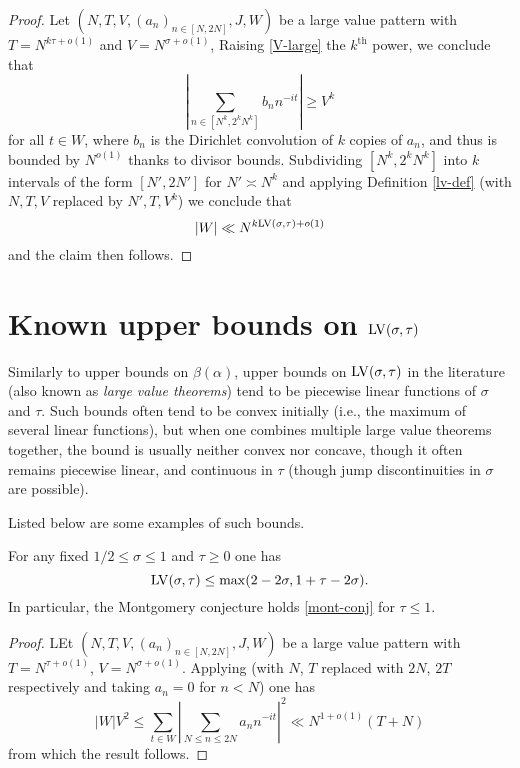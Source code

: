 \begin{proof} Let  $(N,T,V,(a_n)_{n \in [N,2N]},J,W)$ be a large value pattern with $T = N^{k\tau+o(1)}$ and $V = N^{\sigma+o(1)}$, Raising \eqref{V-large} the $k^{\mathrm{th}}$ power, we conclude that
$$ \left|\sum_{n \in [N^k,2^kN^k]} b_n n^{-it} \right| \geq V^k$$
for all $t \in W$, where $b_n$ is the Dirichlet convolution of $k$ copies of $a_n$, and thus is bounded by $N^{o(1)}$ thanks to divisor bounds.  Subdividing $[N^k, 2^k N^k]$ into $k$ intervals of the form $[N',2N']$ for $N' \asymp N^k$ and applying Definition \ref{lv-def} (with $N, T, V$ replaced by $N', T, V^k$) we conclude that
$$ |W| \ll N^{k \mathrm{LV}(\sigma,\tau) + o(1)}$$
and the claim then follows.
\end{proof}

\section{Known upper bounds on \texorpdfstring{$\mathrm{LV}(\sigma,\tau)$}{LV(sigma,tau)}}

Similarly to upper bounds on $\beta(\alpha)$, upper bounds on $\mathrm{LV}(\sigma,\tau)$ in the literature (also known as \emph{large value theorems}) tend to be piecewise linear functions of $\sigma$ and $\tau$.  Such bounds often tend to be convex initially (i.e., the maximum of several linear functions), but when one combines multiple large value theorems together, the bound is usually neither convex nor concave, though it often remains piecewise linear, and continuous in $\tau$ (though jump discontinuities in $\sigma$ are possible).

Listed below are some examples of such bounds.

\begin{theorem}\label{l2-mvt} For any fixed $1/2 \leq \sigma \leq 1$ and $\tau\geq 0$ one has
    $$ \mathrm{LV}(\sigma,\tau) \leq \max( 2-2\sigma, 1 + \tau - 2 \sigma).$$
In particular, the Montgomery conjecture holds \eqref{mont-conj} for $\tau \leq 1$.
\end{theorem}


\begin{proof}
LEt $(N,T,V,(a_n)_{n \in [N,2N]},J,W)$ be a large value pattern with $T = N^{\tau + o(1)}$, $V = N^{\sigma + o(1)}$. Applying \cite[Theorem~9.4]{ik} (with $N$, $T$ replaced with $2N$, $2T$ respectively and taking $a_n = 0$ for $n < N$) one has
\[
|W|V^2 \le \sum_{t \in W} \left|\sum_{N \le n \le 2N} a_n n^{-it}\right|^2 \ll N^{1 + o(1)}(T + N)
\]
from which the result follows.
\end{proof}

